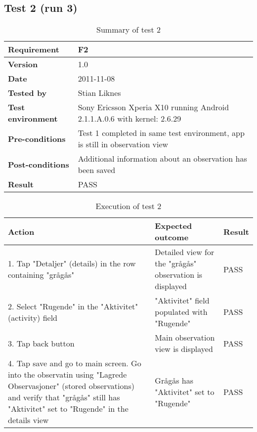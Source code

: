 \newpage
\subsection*{Test 2 (run 3)}

	\begin{table}[htb]
		\centering
		\begin{tabular}{|p{3.5cm}|p{7.0cm}|} \hline
			\textbf{Requirement} & F2 \\ \hline
			\textbf{Version} & 1.0 \\ \hline
			\textbf{Date} & 2011-11-08 \\ \hline
			\textbf{Tested by} & Stian Liknes \\ \hline
			\textbf{Test environment} & Sony Ericsson Xperia X10 running Android 2.1.1.A.0.6 with kernel: 2.6.29 \\ \hline
			\textbf{Pre-conditions} & Test 1 completed in same test environment, app is still in observation view \\ \hline
			\textbf{Post-conditions} & Additional information about an observation has been saved \\ \hline
			\textbf{Result} & PASS \\ \hline
		\end{tabular}
		\caption{Summary of test 2}
	\end{table}

	\begin{table}[htb]
		\centering

		\begin{tabular}{|p{5.0cm}|p{5.0cm}|p{1cm}|}
			\hline \textbf{Action} & \textbf{Expected outcome} & \textbf{Result} \\ \hline

			1. Tap "Detaljer" (details) in the row containing "grågås" &
			Detailed view for the "grågås" observation is displayed & 
			PASS \\ \hline

			2. Select "Rugende" in the "Aktivitet" (activity) field &
			"Aktivitet" field populated with "Rugende" &
			PASS \\ \hline

			3. Tap back button & 
			Main observation view is displayed & 
			PASS \\ \hline

			4. Tap save and go to main screen. Go into the observatin using
			"Lagrede Observasjoner" (stored observations) and verify that "grågås"
			still has "Aktivitet" set to "Rugende" in the details view &
			Grågås has "Aktivitet" set to "Rugende" &
			PASS \\ \hline
		\end{tabular}
		\caption{Execution of test 2}
	\end{table}

